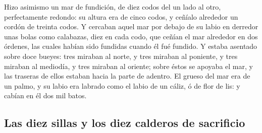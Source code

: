  Hizo asimismo un mar de fundición, de diez codos del un
lado al otro, perfectamente redondo: su altura era de cinco codos, y
ceñíalo alrededor un cordón de treinta codos.  Y cercaban
aquel mar por debajo de su labio en derredor unas bolas como calabazas,
diez en cada codo, que ceñían el mar alrededor en dos órdenes, las
cuales habían sido fundidas cuando él fué fundido.  Y
estaba asentado sobre doce bueyes: tres miraban al norte, y tres miraban
al poniente, y tres miraban al mediodía, y tres miraban al oriente;
sobre éstos se apoyaba el mar, y las traseras de ellos estaban hacia la
parte de adentro.  El grueso del mar era de un palmo, y
su labio era labrado como el labio de un cáliz, ó de flor de lis: y
cabían en él dos mil batos.

\hypertarget{las-diez-sillas-y-los-diez-calderos-de-sacrificio}{%
\subsection{Las diez sillas y los diez calderos de
sacrificio}\label{las-diez-sillas-y-los-diez-calderos-de-sacrificio}}

